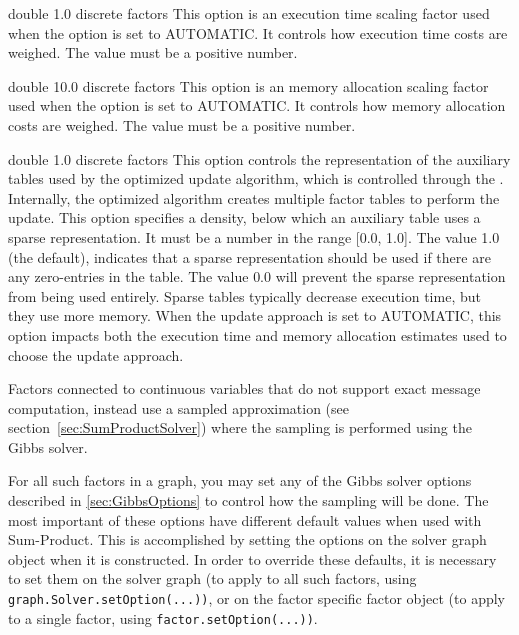 
{double}
{1.0}
{discrete factors}
{This option is an execution time scaling factor used when the  option is set to AUTOMATIC. It controls how execution time costs are weighed. The value must be a positive number.}


{double}
{10.0}
{discrete factors}
{This option is an memory allocation scaling factor used when the  option is set to AUTOMATIC. It controls how memory allocation costs are weighed. The value must be a positive number.}


{double}
{1.0}
{discrete factors}
{This option controls the representation of the auxiliary tables used by the optimized update algorithm, which is controlled through the . Internally, the optimized algorithm creates multiple factor tables to perform the update. This option specifies a density, below which an auxiliary table uses a sparse representation. It must be a number in the range [0.0, 1.0]. The value 1.0 (the default), indicates that a sparse representation should be used if there are any zero-entries in the table. The value 0.0 will prevent the sparse representation from being used entirely. Sparse tables typically decrease execution time, but they use more memory. When the update approach is set to AUTOMATIC, this option impacts both the execution time and memory allocation estimates used to choose the update approach.}


Factors connected to continuous variables that do not support exact message computation, instead use a sampled approximation (see section~\ref{sec:SumProductSolver}) where the sampling is performed using the Gibbs solver.

For all such factors in a graph, you may set any of the Gibbs solver options described in \autoref{sec:GibbsOptions} to control how the sampling will be done. The most important of these options have different default values when used with Sum-Product. This is accomplished by setting the options on the solver graph object when it is constructed. In order to override these defaults, it is necessary to set them on the solver graph (to apply to all such factors, using \texttt{graph.Solver.setOption(...))}, or on the factor specific factor object (to apply to a single factor, using \texttt{factor.setOption(...))}.

